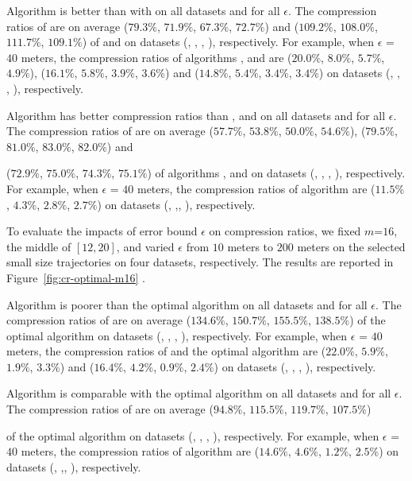  Algorithm \cist is better than  with \dps on all datasets and for all $\epsilon$.
The compression ratios of \cist are on average {($79.3\%$, $71.9\%$, $67.3\%$, $72.7\%$) and ($109.2\%$, $108.0\%$, $111.7\%$, $109.1\%$)} of \squishe and
\dps on {datasets (\sercar, \geolife, \mopsi, \pricar)}, respectively.
For example, when $\epsilon$ = $40$ meters, the compression ratios of algorithms
\squishe, \cist and \dps are 
{($20.0\%$, $8.0\%$, $5.7\%$, $4.9\%$), ($16.1\%$, $5.8\%$, $3.9\%$, $3.6\%$) and ($14.8\%$, $5.4\%$, $3.4\%$, $3.4\%$)} on  {datasets (\sercar, \geolife, \mopsi, \pricar)}, respectively.

 Algorithm \cista has better compression ratios than \dpa, \squishe and \cist on all datasets and for all $\epsilon$.
The compression ratios of \cista are on average ($57.7\%$, $53.8\%$, $50.0\%$, $54.6\%$), ($79.5\%$, $81.0\%$, $83.0\%$, $82.0\%$) and {($72.9\%$, $75.0\%$, $74.3\%$, $75.1\%$) of algorithms
\squishe, \dps and \cist on {datasets (\sercar, \geolife, \mopsi, \pricar)}, respectively.
For example, when $\epsilon$ = $40$ meters, the compression ratios of algorithm
\cista are ($11.5\%$, $4.3\%$, $2.8\%$, $2.7\%$) on datasets (\sercar, \geolife,\mopsi, \pricar), respectively.

To evaluate the impacts of error bound $\epsilon$ on compression ratios, we fixed {$m$=$16$}, the middle of $[12, 20]$, and varied $\epsilon$ from $10$ meters to $200$ meters on the selected small size trajectories on four datasets, respectively.
The results are reported in Figure~\ref{fig:cr-optimal-m16} .

 Algorithm \cist is poorer than the optimal algorithm on all datasets and for all $\epsilon$.
The compression ratios of \cist are on average ($134.6\%$, $150.7\%$, $155.5\%$, $138.5\%$) of the optimal algorithm on {datasets (\sercar, \geolife, \mopsi, \pricar)}, respectively.
For example, when $\epsilon$ = $40$ meters, the compression ratios of \cist and the optimal algorithm are 
($22.0\%$, $5.9\%$, $1.9\%$, $3.3\%$) and {($16.4\%$, $4.2\%$, $0.9\%$, $2.4\%$)}
on  {datasets (\sercar, \geolife, \mopsi, \pricar)}, respectively.

 Algorithm \cista is comparable with the optimal algorithm on all datasets and for all $\epsilon$.
The compression ratios of \cista are on average  ($94.8\%$, $115.5\%$, $119.7\%$, $107.5\%$)} of the optimal algorithm
 on {datasets (\sercar, \geolife, \mopsi, \pricar)}, respectively.
For example, when $\epsilon$ = $40$ meters, the compression ratios of algorithm
\cista are ($14.6\%$, $4.6\%$, $1.2\%$, $2.5\%$) on datasets (\sercar, \geolife,\mopsi, \pricar), respectively.

